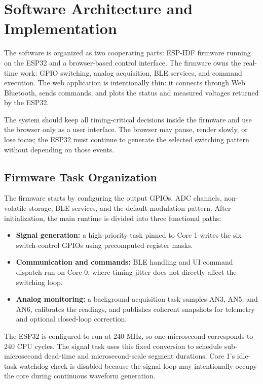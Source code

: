 \section{Software Architecture and Implementation}

The software is organized as two cooperating parts: ESP-IDF firmware running on the
ESP32 and a browser-based control interface. The firmware owns the real-time work:
GPIO switching, analog acquisition, BLE services, and command execution. The web
application is intentionally thin: it connects through Web Bluetooth, sends commands,
and plots the status and measured voltages returned by the ESP32.

The system should keep all timing-critical decisions inside the firmware and use the 
browser only as a user interface. The browser may pause, render slowly, or lose focus; 
the ESP32 must continue to generate the selected switching pattern without depending on 
those events.

\subsection{Firmware Task Organization}

The firmware starts by configuring the output GPIOs, ADC channels, non-volatile
storage, BLE services, and the default modulation pattern. After initialization, the
main runtime is divided into three functional paths:

\begin{itemize}
	\item \textbf{Signal generation:} a high-priority task pinned to Core 1 writes the
	      six switch-control GPIOs using precomputed register masks.
	\item \textbf{Communication and commands:} BLE handling and UI command dispatch run
	      on Core 0, where timing jitter does not directly affect the switching loop.
	\item \textbf{Analog monitoring:} a background acquisition task samples AN3, AN5,
	      and AN6, calibrates the readings, and publishes coherent snapshots for
	      telemetry and optional closed-loop correction.
\end{itemize}

The ESP32 is configured to run at 240 MHz, so one microsecond corresponds to 240 CPU
cycles. The signal task uses this fixed conversion to schedule sub-microsecond
dead-time and microsecond-scale segment durations. Core 1's idle-task watchdog check is
disabled because the signal loop may intentionally occupy the core during continuous
waveform generation.

